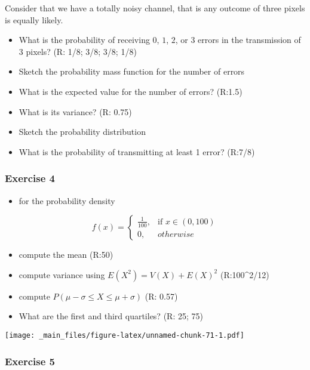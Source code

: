 \documentclass[
]{book}
\providecommand{\tightlist}{%
  \setlength{\itemsep}{0pt}\setlength{\parskip}{0pt}}
\begin{document}
Consider that we have a totally noisy channel, that is any outcome of three pixels is equally likely.

\begin{itemize}
\item
  What is the probability of receiving \(0\), \(1\), \(2\), or \(3\) errors in the transmission of \(3\) pixels? (R: 1/8; 3/8; 3/8; 1/8)
\item
  Sketch the probability mass function for the number of errors
\item
  What is the expected value for the number of errors? (R:1.5)
\item
  What is its variance? (R: 0.75)
\item
  Sketch the probability distribution
\item
  What is the probability of transmitting at least 1 error? (R:7/8)
\end{itemize}

\hypertarget{exercise-4-1}{%
\subsubsection{Exercise 4}\label{exercise-4-1}}

\begin{itemize}
\tightlist
\item
  for the probability density
\end{itemize}

\[
    f(x)= 
\begin{cases}
    \frac{1}{100},& \text{if } x\in (0,100)\\
    0,& otherwise 
\end{cases}
\]

\begin{itemize}
\tightlist
\item
  compute the mean (R:50)
\item
  compute variance using \(E(X^2)=V(X)+E(X)^2\) (R:100\^{}2/12)
\item
  compute \(P(\mu-\sigma\leq X \leq \mu+\sigma)\) (R: 0.57)
\item
  What are the first and third quartiles? (R: 25; 75)
\end{itemize}

\texttt{[image: \_main\_files/figure-latex/unnamed-chunk-71-1.pdf]}

\hypertarget{exercise-5-1}{%
\subsubsection{Exercise 5}\label{exercise-5-1}}
\end{document}
